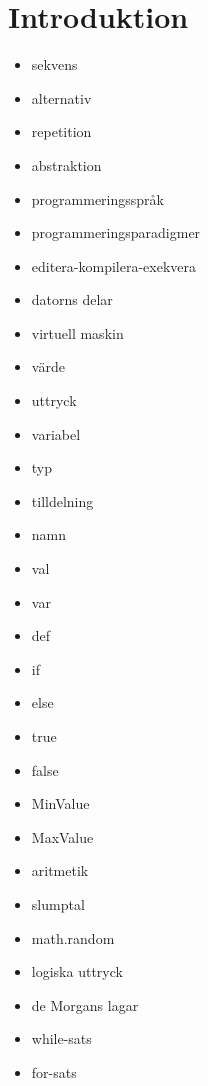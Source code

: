 \chapter{Introduktion}\label{chapter:W01}
\begin{multicols}{2}\begin{itemize}[nosep,label={$\square$}]
\item sekvens
\item alternativ
\item repetition
\item abstraktion
\item programmeringsspråk
\item programmeringsparadigmer
\item editera-kompilera-exekvera
\item datorns delar
\item virtuell maskin
\item värde
\item uttryck
\item variabel
\item typ
\item tilldelning
\item namn
\item val
\item var
\item def
\item if
\item else
\item true
\item false
\item MinValue
\item MaxValue
\item aritmetik
\item slumptal
\item math.random
\item logiska uttryck
\item de Morgans lagar
\item while-sats
\item for-sats\end{itemize}\end{multicols}
